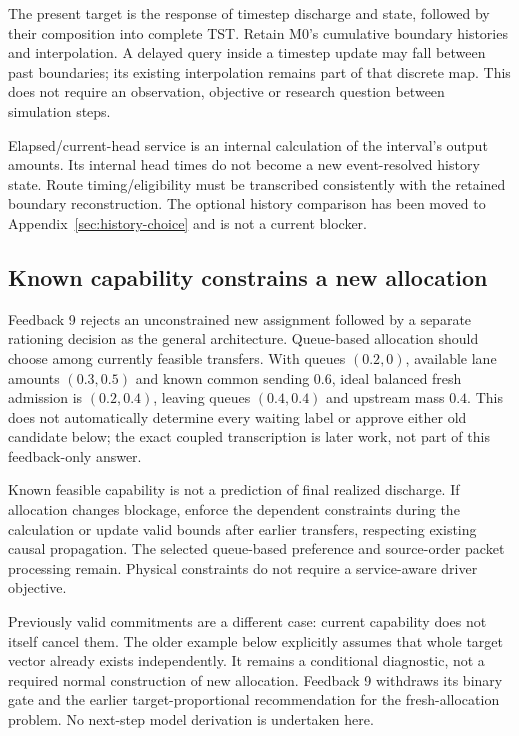 \documentclass[11pt]{article}
\begin{document}
The present target is the response of timestep discharge and state, followed by their composition into complete TST. Retain M0's cumulative boundary histories and interpolation. A delayed query inside a timestep update may fall between past boundaries; its existing interpolation remains part of that discrete map. This does not require an observation, objective or research question between simulation steps.

Elapsed/current-head service is an internal calculation of the interval's output amounts. Its internal head times do not become a new event-resolved history state. Route timing/eligibility must be transcribed consistently with the retained boundary reconstruction. The optional history comparison has been moved to Appendix~\ref{sec:history-choice} and is not a current blocker.

\subsection*{Known capability constrains a new allocation}

Feedback 9 rejects an unconstrained new assignment followed by a separate rationing decision as the general architecture. Queue-based allocation should choose among currently feasible transfers. With queues $(0.2,0)$, available lane amounts $(0.3,0.5)$ and known common sending $0.6$, ideal balanced fresh admission is $(0.2,0.4)$, leaving queues $(0.4,0.4)$ and upstream mass $0.4$. This does not automatically determine every waiting label or approve either old candidate below; the exact coupled transcription is later work, not part of this feedback-only answer.

Known feasible capability is not a prediction of final realized discharge. If allocation changes blockage, enforce the dependent constraints during the calculation or update valid bounds after earlier transfers, respecting existing causal propagation. The selected queue-based preference and source-order packet processing remain. Physical constraints do not require a service-aware driver objective.

Previously valid commitments are a different case: current capability does not itself cancel them. The older example below explicitly assumes that whole target vector already exists independently. It remains a conditional diagnostic, not a required normal construction of new allocation. Feedback 9 withdraws its binary gate and the earlier target-proportional recommendation for the fresh-allocation problem. No next-step model derivation is undertaken here.
\end{document}
